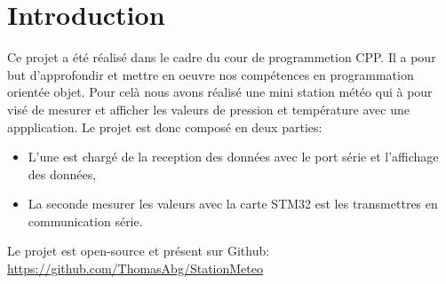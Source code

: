 \chapter{Introduction}

Ce projet a été réalisé dans le cadre du cour de programmetion CPP. \newline
Il a pour but d'approfondir et mettre en oeuvre nos compétences en programmation orientée objet. \newline
Pour celà nous avons réalisé une mini station météo qui à pour visé de mesurer et afficher les valeurs de pression et température avec une appplication. \newline
Le projet est donc composé en deux parties:
\begin{itemize}
    \item L'une est chargé de la reception des données avec le port série et l'affichage des données,
    \item La seconde mesurer les valeurs avec la carte STM32 est les transmettres en communication série.
\end{itemize}
\newline
\newline
Le projet est open-source et présent sur Github: \url{https://github.com/ThomasAbg/StationMeteo}

